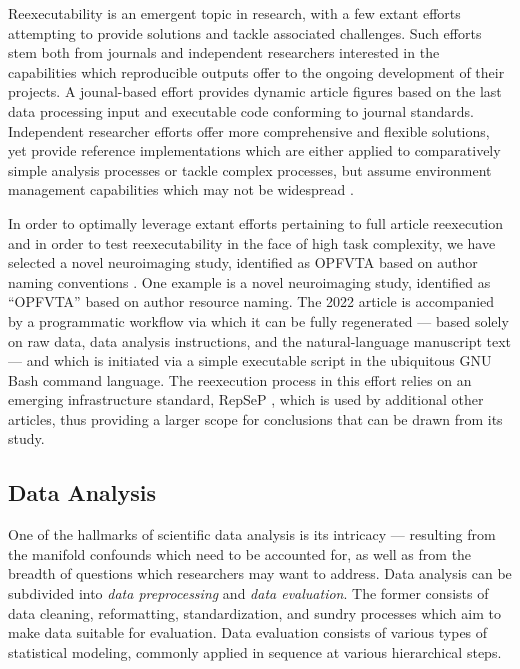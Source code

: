 Reexecutability is an emergent topic in research, with a few extant efforts attempting to provide solutions and tackle associated challenges.
Such efforts stem both from journals and independent researchers interested in the capabilities which reproducible outputs offer to the ongoing development of their projects.
A jounal-based effort \cite{eliferep} provides dynamic article figures based on the last data processing input and executable code conforming to journal standards.
Independent researcher efforts offer more comprehensive and flexible solutions, yet provide reference implementations which are either applied to comparatively simple analysis processes \cite[“Use cases” annex]{datalad} or tackle complex processes, but assume environment management capabilities which may not be widespread \cite{repsep}.

In order to optimally leverage extant efforts pertaining to full article reexecution and in order to test reexecutability in the face of high task complexity, we have selected a novel neuroimaging study, identified as OPFVTA based on author naming conventions \cite{opfvta}.
One example is a novel neuroimaging study, identified as “OPFVTA” \cite{opfvta} based on author resource naming.
The 2022 article is accompanied by a programmatic workflow via which it can be fully regenerated — based solely on raw data, data analysis instructions, and the natural-language manuscript text — and which is initiated via a simple executable script in the ubiquitous GNU Bash \cite{bash} command language.
The reexecution process in this effort relies on an emerging infrastructure standard, RepSeP \cite{repsep}, which is used by additional other articles, thus providing a larger scope for conclusions that can be drawn from its study.


\subsection{Data Analysis}

One of the hallmarks of scientific data analysis is its intricacy — resulting from the manifold confounds which need to be accounted for, as well as from the breadth of questions which researchers may want to address.
Data analysis can be subdivided into \emph{data preprocessing} and \emph{data evaluation}.
The former consists of data cleaning, reformatting, standardization, and sundry processes which aim to make data suitable for evaluation.
Data evaluation consists of various types of statistical modeling, commonly applied in sequence at various hierarchical steps.

